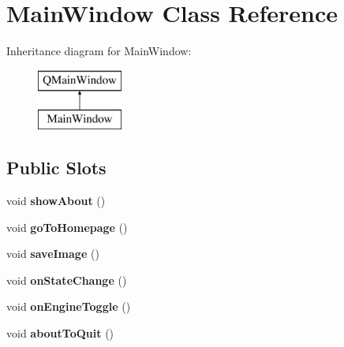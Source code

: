 \hypertarget{classMainWindow}{\section{Main\-Window Class Reference}
\label{classMainWindow}
}
Inheritance diagram for Main\-Window\-:\begin{figure}[H]
\begin{center}
\leavevmode
\includegraphics[height=2.000000cm]{classMainWindow}
\end{center}
\end{figure}
\subsection*{Public Slots}
\begin{DoxyCompactItemize}
\item 
\hypertarget{classMainWindow_aa3aa0f3ce42e748b931d6211921ea197}{void {\bfseries show\-About} ()}\label{classMainWindow_aa3aa0f3ce42e748b931d6211921ea197}

\item 
\hypertarget{classMainWindow_a773143409d99d112188100e1c32cb05c}{void {\bfseries go\-To\-Homepage} ()}\label{classMainWindow_a773143409d99d112188100e1c32cb05c}

\item 
\hypertarget{classMainWindow_a0acff490b8462a28cbe7627520559626}{void {\bfseries save\-Image} ()}\label{classMainWindow_a0acff490b8462a28cbe7627520559626}

\item 
\hypertarget{classMainWindow_a422893a79887001fc3eea93795593684}{void {\bfseries on\-State\-Change} ()}\label{classMainWindow_a422893a79887001fc3eea93795593684}

\item 
\hypertarget{classMainWindow_a5d6ccbf2b3dd52967400aa85207df690}{void {\bfseries on\-Engine\-Toggle} ()}\label{classMainWindow_a5d6ccbf2b3dd52967400aa85207df690}

\item 
\hypertarget{classMainWindow_a41395b3febf4c123816a19157633baaf}{void {\bfseries about\-To\-Quit} ()}\label{classMainWindow_a41395b3febf4c123816a19157633baaf}

\end{DoxyCompactItemize}
